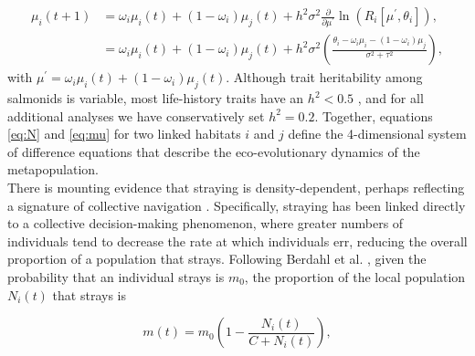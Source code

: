 \documentclass{revtex4}
\begin{document}
\begin{align}
  \label{eq:mu}
  \mu_i(t+1) &= \omega_i\mu_i(t) + (1-\omega_i)\mu_j(t) + h^2\sigma^2\frac{\partial}{\partial \mu^\prime}\ln\left(R_i[\mu^\prime,\theta_i] \right), \\ \nonumber
  &= \omega_i\mu_i(t) + (1-\omega_i)\mu_j(t) + h^2\sigma^2\left(\frac{\theta_i - \omega_i\mu_i - (1-\omega_i)\mu_j}{\sigma^2+\tau^2} \right),
\end{align}
with $\mu^\prime = \omega_i \mu_i(t)+ (1-\omega_i)\mu_j(t)$.
Although trait heritability among salmonids is variable, most life-history traits have an $h^2 < 0.5$ \citep{Carlson:2008hl}, and for all additional analyses we have conservatively set $h^2=0.2$.
Together, equations \ref{eq:N} and \ref{eq:mu} for two linked habitats $i$ and $j$ define the 4-dimensional system of difference equations that describe the eco-evolutionary dynamics of the metapopulation. \\


\noindent There is mounting evidence that straying is density-dependent, perhaps reflecting a signature of collective navigation \citep{Berdahl:2014bl,Berdahl:2017uu}.
Specifically, straying has been linked directly to a collective decision-making phenomenon, where greater numbers of individuals tend to decrease the rate at which individuals err, reducing the overall proportion of a population that strays.
Following Berdahl et al. \citep{Berdahl:2016dx}, given the probability that an individual strays is $m_0$, the proportion of the local population $N_i(t)$ that strays is

\begin{equation}
  m(t) = m_0\left(1- \frac{N_i(t)}{C+N_i(t)}\right),
  \label{eq:ddm}
\end{equation}
\end{document}
